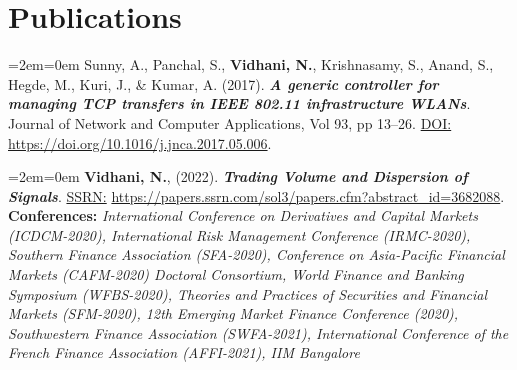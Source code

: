 \documentclass[11pt,a4paper,]{moderncv}
\begin{document}
\nopagebreak

\hypertarget{publications}{%
\section{Publications}\label{publications}}

\begingroup
\setlength{\parindent}{-0.5in}
\setlength{\leftskip}{0.5in}

%
  \par%
  \medskip
  \leftskip=2em\rightskip=0em%
  \noindent\ignorespaces
Sunny, A., Panchal, S., \textbf{Vidhani, N.}, Krishnasamy, S., Anand, S., Hegde, M., Kuri, J., \& Kumar, A. (2017).
\textbf{\textit{A generic controller for managing TCP transfers in IEEE 802.11 infrastructure WLANs}}. Journal of Network and Computer Applications, Vol 93, pp 13--26. \underline{DOI:} \url{https://doi.org/10.1016/j.jnca.2017.05.006}.\\
%
  \par\medskip

%
  \par%
  \medskip
  \leftskip=2em\rightskip=0em%
  \noindent\ignorespaces
\textbf{Vidhani, N.}, (2022). \textbf{\textit{Trading Volume and Dispersion of Signals}}. \underline{SSRN:} \url{https://papers.ssrn.com/sol3/papers.cfm?abstract_id=3682088}.\\
\textbf{Conferences:} \textit{International Conference on Derivatives and Capital Markets (ICDCM-2020), International Risk Management Conference (IRMC-2020), Southern Finance Association (SFA-2020), Conference on Asia-Pacific Financial Markets (CAFM-2020) Doctoral Consortium, World Finance and Banking Symposium (WFBS-2020), Theories and Practices of Securities and Financial Markets (SFM-2020), 12th Emerging Market Finance Conference (2020), Southwestern Finance Association (SWFA-2021), International Conference of the French Finance Association (AFFI-2021), IIM Bangalore}\\
%
  \par\medskip
\end{document}
